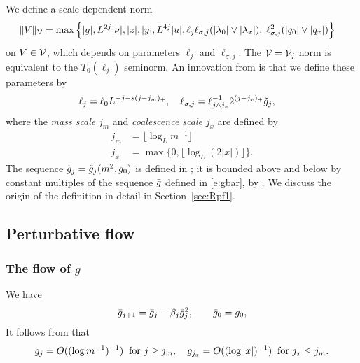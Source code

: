We define a scale-dependent norm
\begin{equation}
\label{e:Vnormdef}
\begin{aligned}
\|V\|_{\mathcal{V}} &=
\max\Big\{
|g|, L^{2j}|\nu|, |z|, |y|,  L^{4j}|u|,
\ell_j\ell_{\sigma,j}(|\lambda_0|\vee|\lambda_x|),\;
 \ell_{\sigma,j}^{2} (|q_0|\vee|q_x|)
\Big\}
\end{aligned}
\end{equation}
on $V \in \mathcal{V}$, which depends on parameters $\ell_j$ and $\ell_{\sigma,j}$.
The $\mathcal{V} = \mathcal{V}_j$ norm is equivalent to the $T_0(\ell_j)$ seminorm.
An innovation from \cite{BSTW-clp} is that we define these parameters by
\begin{align}
\label{e:elldef-zz}
\ell_j &= \ell_0 L^{-j - s (j - j_m)_+}, \quad
\ell_{\sigma,j}
=
\ell_{j \wedge j_{x}}^{-1} 2^{(j - j_{x})_+} \tilde{g}_j,
\end{align}
where the \emph{mass scale} $j_m$ and \emph{coalescence scale} $j_x$
are defined by
\begin{align}
\label{e:jmdef}
j_m		&= \lfloor\log_{L} m^{-1}\rfloor
	\\
\label{e:jxdef}
j_x 	&= \max\{0,\lfloor \log_{L} (2 |x|)\rfloor\}.
\end{align}
The sequence $\tilde{g}_j = \tilde{g}_j(m^2,g_0)$ is defined in
\cite[\eqref{log-e:ggendef}]{BBS-saw4-log};
it is bounded above and below by constant multiples of
the sequence $\bar{g}$ defined in
\eqref{e:gbar},
by
\cite[Lemma~\ref{log-lem:gbarmcomp}]{BBS-saw4-log}.
We discuss the origin of the definition  in detail
in Section~\ref{sec:Rpf1}.


\subsection{Perturbative flow}


\subsubsection{The flow of \texorpdfstring{$g$}{g}}

We have
\begin{equation} \label{e:gbar}
  \bar{g}_{j+1}
  =
  \bar{g}_j
  -
  \beta_j  \bar{g}_j^{2}, \qquad \bar{g}_0 = g_0,
\end{equation}
It follows from \cite[Proposition~\ref{log-prop:approximate-flow}]{BBS-saw4-log} that
\begin{equation}
\label{e:gjxgjmbd}
\bar{g}_{j}
	=
O((\log m^{-1})^{-1}) \;\; \text{for $j \geq j_m$},
	\quad
\bar{g}_{j_x}
	=
O((\log |x|)^{-1}) \;\; \text{for $j_x \leq j_m$.}
\end{equation}

